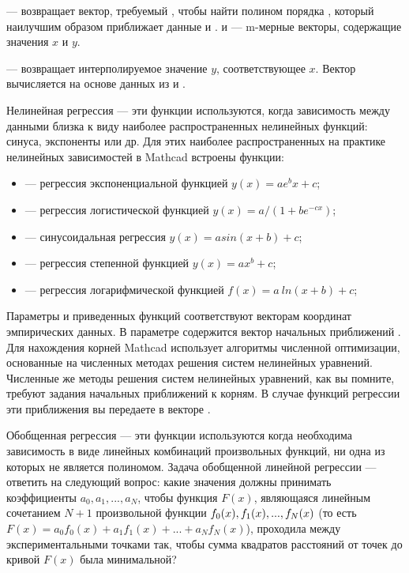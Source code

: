  --- возвращает вектор, требуемый , чтобы найти полином порядка , который наилучшим образом приближает данные  и .  и  --- m-мерные векторы, содержащие значения $x$ и $y$.

 --- возвращает интерполируемое значение $y$, соответствующее $x$. Вектор  вычисляется  на основе данных из  и .




Нелинейная регрессия --- эти функции используются, когда зависимость между данными близка к виду наиболее распространенных нелинейных функций: синуса, экспоненты или др. Для этих наиболее распространенных на практике нелинейных зависимостей в Mathcad встроены функции: 
\begin{itemize}
	\item {} --- регрессия  экспоненциальной функцией $y(x)=a e^b x+c$;
	\item {} --- регрессия логистической функцией $y(x)=a/(1+b e^{-c x})$;
	\item {} --- синусоидальная регрессия $y(x)=a sin(x+b)+c$;
	\item {} --- регрессия степенной функцией $y(x)=a x^b+c$;
	\item {} --- регрессия логарифмической функцией $f(x)=a\ ln(x+b)+c$;
\end{itemize}

Параметры  и  приведенных функций соответствуют векторам координат эмпирических данных. В параметре  содержится вектор начальных приближений . Для нахождения корней Mathcad использует алгоритмы численной оптимизации, основанные на численных методах решения систем нелинейных уравнений. Численные же методы решения систем нелинейных уравнений, как вы помните, требуют задания начальных приближений к корням. В случае функций регрессии эти приближения вы передаете в векторе .

Обобщенная регрессия --- эти функции используются когда необходима зависимость в виде линейных комбинаций произвольных функций, ни одна из которых не является полиномом.
Задача обобщенной линейной регрессии --- ответить на следующий вопрос: какие значения должны принимать коэффициенты $a_0, a_1, ..., a_N$, чтобы функция $F(x)$, являющаяся линейным сочетанием $N+1$ произвольной функции $f_0(x), f_1(x),\\ ..., f_N(x)$ (то есть  $F(x)=a_0 f_0(x)+a_1 f_1(x)+ ... + a_N f_N(x)$), проходила между экспериментальными точками так, чтобы сумма квадратов расстояний от точек до кривой $F(x)$ была минимальной?

